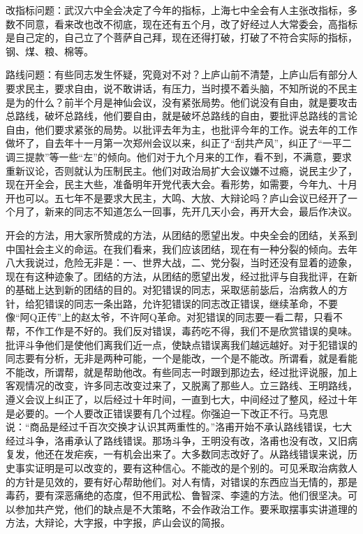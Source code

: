 改指标问题：武汉六中全会决定了今年的指标，上海七中全会有人主张改指标，多数不同意，看来改也改不彻底，现在还有五个月，改了好经过人大常委会，高指标是自己定的，自己立了个菩萨自己拜，现在还得打破，打破了不符合实际的指标，钢、煤、粮、棉等。

路线问题：有些同志发生怀疑，究竟对不对？上庐山前不清楚，上庐山后有部分人要求民主，要求自由，说不敢讲话，有压力，当时摸不着头脑，不知所说的不民主是为的什么？前半个月是神仙会议，没有紧张局势。他们说没有自由，就是要攻击总路线，破坏总路线，他们要自由，就是破坏总路线的自由，要批评总路线的言论自由，他们要求紧张的局势。以批评去年为主，也批评今年的工作。说去年的工作做坏了，自去年十一月第一次郑州会议以来，纠正了“刮共产风”，纠正了“一平二调三提款”等一些“左”的倾向。他们对于九个月来的工作，看不到，不满意，要求重新议论，否则就认为压制民主。他们对政治局扩大会议嫌不过瘾，说民主少了，现在开全会，民主大些，准备明年开党代表大会。看形势，如需要，今年九、十月开也可以。五七年不是要求大民主，大鸣、大放、大辩论吗？庐山会议已经开了一个月了，新来的同志不知道怎么一回事，先开几天小会，再开大会，最后作决议。

开会的方法，用大家所赞成的方法，从团结的愿望出发。中央全会的团结，关系到中国社会主义的命运。在我们看来，我们应该团结，现在有一种分裂的倾向。去年八大我说过，危险无非是：一、世界大战，二、党分裂，当时还没有显着的迹象，现在有这种迹象了。团结的方法，从团结的愿望出发，经过批评与自我批评，在新的基础上达到新的团结的目的。对犯错误的同志，采取惩前毖后，治病救人的方针，给犯错误的同志一条出路，允许犯错误的同志改正错误，继续革命，不要像“阿Q正传”上的赵太爷，不许阿Q革命。对犯错误的同志要一看二帮，只看不帮，不作工作是不好的。我们反对错误，毒药吃不得，我们不是欣赏错误的臭味。批评斗争他们是使他们离我们近一点，使缺点错误离我们越远越好。对于犯错误的同志要有分析，无非是两种可能，一个是能改，一个是不能改。所谓看，就是看能不能改，所谓帮，就是帮助他改。有些同志一时跟到那边去，经过批评说服，加上客观情况的改变，许多同志改变过来了，又脱离了那些人。立三路线、王明路线，遵义会议上纠正了，以后经过十年时间，一直到七大，中间经过了整风，经过十年是必要的。一个人要改正错误要有几个过程。你强迫一下改正不行。马克思说：“商品是经过千百次交换才认识其两重性的。”洛甫开始不承认路线错误，七大经过斗争，洛甫承认了路线错误。那场斗争，王明没有改，洛甫也没有改，又旧病复发，他还在发疟疾，一有机会出来了。大多数同志改好了。从路线错误来说，历史事实证明是可以改变的，要有这种信心。不能改的是个别的。可见釆取治病救人的方针是见效的，要有好心帮助他们。对人有情，对错误的东西应当无情的，那是毒药，要有深恶痛绝的态度，但不用武松、鲁智深、李逵的方法。他们很坚决。可以参加共产党，他们的缺点是不大策略，不会作政治工作。要釆取摆事实讲道理的方法，大辩论，大字报，中字报，庐山会议的简报。

